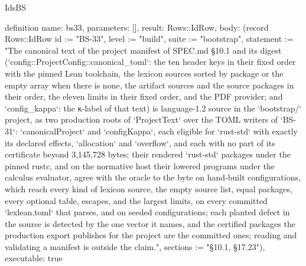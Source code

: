 \begin{lexlean}{IdsBS}
\begin{semanticmodule}
definition{
  name: bs33,
  parameters: [],
  result: Rows::IdRow,
  body: (record Rows::IdRow {id := "BS-33", level := "build", suite := "bootstrap", statement := "The canonical text of the project manifest of SPEC.md §10.1 and its digest (`config::ProjectConfig::canonical_toml`: the ten header keys in their fixed order with the pinned Lean toolchain, the lexicon sources sorted by package or the empty array when there is none, the artifact sources and the source packages in their order, the eleven limits in their fixed order, and the PDF provider; and `config_kappa`: the κ-label of that text) is language-1.2 source in the `bootstrap/` project, as two production roots of `ProjectText` over the TOML writers of `BS-31`: `canonicalProject` and `configKappa`, each eligible for `rust-std` with exactly its declared effects, `allocation` and `overflow`, and each with no part of its certificate beyond 3,145,728 bytes; their rendered `rust-std` packages under the pinned rustc, and on the normative host their lowered programs under the calculus evaluator, agree with the oracle to the byte on hand-built configurations, which reach every kind of lexicon source, the empty source list, equal packages, every optional table, escapes, and the largest limits, on every committed `lexlean.toml` that parses, and on seeded configurations; each planted defect in the source is detected by the one vector it names, and the certified packages the production export publishes for the project are the committed ones; reading and validating a manifest is outside the claim.", sections := "§10.1, §17.23"}),
  executable: true
}


\end{semanticmodule}
\end{lexlean}

